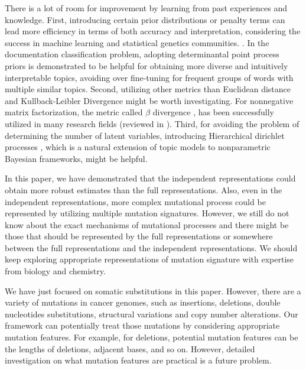 There is a lot of room for improvement by learning from past experiences and knowledge.
First, introducing certain prior distributions or penalty terms can lead more efficiency in terms of both accuracy and interpretation,
considering the success in machine learning and statistical genetics communities.
\cite{hoyer2004non, engelhardt2010analysis}.
In the documentation classification problem, 
adopting determinantal point process priors \cite{kulesza2012determinantal, kwok2012priors}
is demonstrated to be helpful for obtaining more diverse and intuitively interpretable topics,
avoiding over fine-tuning for frequent groups of words with multiple similar topics.
Second, utilizing other metrics than Euclidean distance and Kullback-Leibler Divergence might be worth investigating.
For nonnegative matrix factorization, 
the metric called $\beta$ divergence \cite{basu1998robust, eguchi2001robustifying}, 
has been successfully utilized in many research fields (reviewed in \cite{fevotte2011algorithms}).
Third, for avoiding the problem of determining the number of latent variables, 
introducing Hierarchical dirichlet processes \cite{teh2006hierarchical}, 
which is a natural extension of topic models to nonparametric Bayesian frameworks, might be helpful.


In this paper, we have demonstrated that the independent representations could obtain more robust estimates than the full representations.
Also, even in the independent representations, more complex mutational process could be represented by utilizing multiple mutation signatures.
However, we still do not know about the exact mechanisms of mutational processes and 
there might be those that should be represented by the full representations or somewhere between the full representations and the independent representations.
We should keep exploring appropriate representations of mutation signature with expertise from biology and chemistry.


We have just focused on somatic substitutions in this paper.
However, there are a variety of mutations in cancer genomes, 
such as insertions, deletions, double nucleotides substitutions, structural variations and copy number alterations.
Our framework can potentially treat those mutations by considering appropriate mutation features.
For example, for deletions, potential mutation features can be the lengths of deletions, adjacent bases, and so on.
However, detailed investigation on what mutation features are practical is a future problem.




